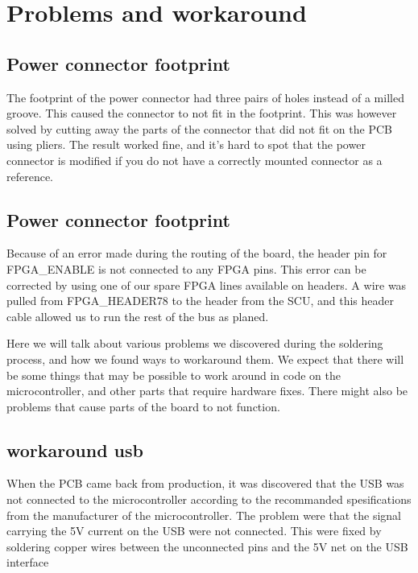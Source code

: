 \section {Problems and workaround}

\subsection{ Power connector footprint }

The footprint of the power connector had three pairs of holes instead of a milled groove.
This caused the connector to not fit in the footprint.
This was however solved by cutting away the parts of the connector that did not fit on the PCB using pliers.
The result worked fine, and it's hard to spot that the power connector is modified if you do not have a correctly mounted connector as a reference.

\subsection{ Power connector footprint }

Because of an error made during the routing of the board, the header pin for FPGA_ENABLE is not connected to any FPGA pins.
This error can be corrected by using one of our spare FPGA lines available on headers.
A wire was pulled from FPGA_HEADER78 to the header from the SCU, and this header cable allowed us to run the rest of the bus as planed.



Here we will talk about various problems we discovered during the soldering process, and how we found ways to workaround them.
We expect that there will be some things that may be possible to work around in code on the microcontroller, and other parts that require hardware fixes.
There might also be problems that cause parts of the board to not function.

\subsection{workaround usb}
When the PCB came back from production, it was discovered that the USB was not connected to the microcontroller
according to the recommanded spesifications from the manufacturer of the microcontroller. The problem were that the
signal carrying the 5V current on the USB were not connected. This were fixed by soldering copper wires between the unconnected pins and the 5V net on the USB interface

